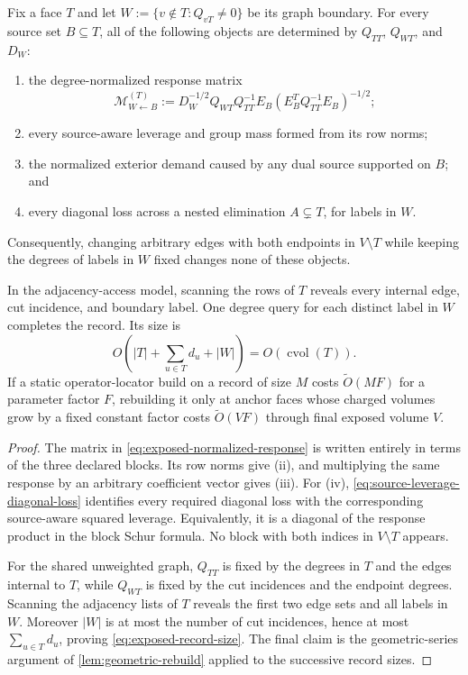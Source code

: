 \begin{proposition}
\label{prop:exposed-incidence-sufficiency}
Fix a face $T$ and let
$W:=\{v\notin T:Q_{vT}\neq0\}$ be its graph boundary.  For every source set
$B\subseteq T$, all of the following objects are determined by
$Q_{TT}$, $Q_{WT}$, and $D_W$:
\begin{enumerate}[label=(\roman*)]
\item the degree-normalized response matrix
\begin{equation}
 \mathcal M_{W\leftarrow B}^{(T)}
 :=D_W^{-1/2}Q_{WT}Q_{TT}^{-1}E_B
   \left(E_B^TQ_{TT}^{-1}E_B\right)^{-1/2};
 \label{eq:exposed-normalized-response}
\end{equation}
\item every source-aware leverage and group mass formed from its row norms;
\item the normalized exterior demand caused by any dual source supported on
      $B$; and
\item every diagonal loss across a nested elimination $A\subsetneq T$, for
      labels in $W$.
\end{enumerate}
Consequently, changing arbitrary edges with both endpoints in $V\setminus T$
while keeping the degrees of labels in $W$ fixed changes none of these
objects.

In the adjacency-access model, scanning the rows of $T$ reveals every
internal edge, cut incidence, and boundary label.  One degree query for each
distinct label in $W$ completes the record.  Its size is
\begin{equation}
 O\!\left(|T|+\sum_{u\in T}d_u+|W|\right)
 =O\!\left(\operatorname{cvol}(T)\right).
 \label{eq:exposed-record-size}
\end{equation}
If a static operator-locator build on a record of size $M$ costs
$\widetilde O(MF)$ for a parameter factor $F$, rebuilding it only at anchor
faces whose charged volumes grow by a fixed constant factor costs
$\widetilde O(VF)$ through final exposed volume $V$.
\end{proposition}

\begin{proof}
The matrix in \cref{eq:exposed-normalized-response} is written entirely in
terms of the three declared blocks.  Its row norms give (ii), and multiplying
the same response by an arbitrary coefficient vector gives (iii).  For (iv),
\cref{eq:source-leverage-diagonal-loss} identifies every required diagonal
loss with the corresponding source-aware squared leverage.  Equivalently, it
is a diagonal of the response product in the block Schur formula.  No block
with both indices in $V\setminus T$ appears.

For the shared unweighted graph, $Q_{TT}$ is fixed by the degrees in $T$ and
the edges internal to $T$, while $Q_{WT}$ is fixed by the cut incidences and
the endpoint degrees.  Scanning the adjacency lists of $T$ reveals the first
two edge sets and all labels in $W$.  Moreover $|W|$ is at most the number of
cut incidences, hence at most $\sum_{u\in T}d_u$, proving
\cref{eq:exposed-record-size}.  The final claim is the geometric-series
argument of \cref{lem:geometric-rebuild} applied to the successive record
sizes.
\end{proof}

